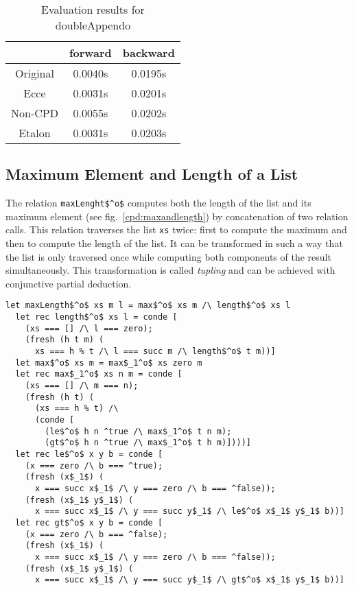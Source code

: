 \begin{table}
  \centering
  \begin{tabular}{c||c||c}
                   & forward & backward \\
  \hline\hline
  Original         & 0.0040s & 0.0195s \\ \hline
  Ecce             & 0.0031s & 0.0201s \\ \hline
  Non-CPD          & 0.0055s & 0.0202s \\ \hline
  Etalon           & 0.0031s & 0.0203s \\
  \end{tabular}
  \caption{Evaluation results for doubleAppendo}
  \label{tbl:doubleApp}
\end{table}

\subsection{Maximum Element and Length of a List}

The relation \lstinline{maxLenght$^o$} computes both the length of the list and its maximum element (see fig.~\ref{cpd:maxandlength}) by concatenation of two relation calls.
This relation traverses the list \lstinline{xs} twice: first to compute the maximum and then to compute the length of the list.
It can be transformed in such a way that the list is only traversed once while computing both components of the result simultaneously.
This transformation is called \emph{tupling} and can be achieved with conjunctive partial deduction.

\begin{figure*}[!h]
  \centering
  \begin{minipage}{0.8\textwidth}
\begin{lstlisting}[label={cpd:maxandlength}, caption={Maximum element and length of the list}, captionpos=b, frame=tb]
  let maxLength$^o$ xs m l = max$^o$ xs m /\ length$^o$ xs l
  let rec length$^o$ xs l = conde [
    (xs === [] /\ l === zero);
    (fresh (h t m) (
      xs === h % t /\ l === succ m /\ length$^o$ t m))]
  let max$^o$ xs m = max$_1^o$ xs zero m
  let rec max$_1^o$ xs n m = conde [
    (xs === [] /\ m === n);
    (fresh (h t) (
      (xs === h % t) /\
      (conde [
        (le$^o$ h n ^true /\ max$_1^o$ t n m);
        (gt$^o$ h n ^true /\ max$_1^o$ t h m)])))]
  let rec le$^o$ x y b = conde [
    (x === zero /\ b === ^true);
    (fresh (x$_1$) (
      x === succ x$_1$ /\ y === zero /\ b === ^false));
    (fresh (x$_1$ y$_1$) (
      x === succ x$_1$ /\ y === succ y$_1$ /\ le$^o$ x$_1$ y$_1$ b))]
  let rec gt$^o$ x y b = conde [
    (x === zero /\ b === ^false);
    (fresh (x$_1$) (
      x === succ x$_1$ /\ y === zero /\ b === ^false));
    (fresh (x$_1$ y$_1$) (
      x === succ x$_1$ /\ y === succ y$_1$ /\ gt$^o$ x$_1$ y$_1$ b))]
  \end{lstlisting}
\end{minipage}
\end{figure*}


